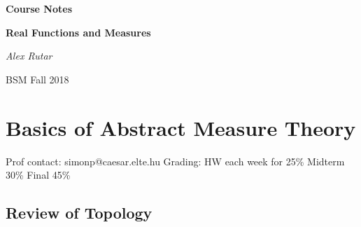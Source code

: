 \documentclass[12pt, a4paper]{book}
\theoremstyle{nonumberplain}
\newcommand{\assignmentname}{Course Notes}
\newcommand{\classname}{Real Functions and Measures}
\newcommand{\semester}{BSM Fall 2018}
\begin{document}
\begin{titlepage}
    \centering
    \vspace{5cm}
    {\huge\textbf{\assignmentname}\par} %
    \vspace{2cm}
    {\Large\textbf{\classname}\par} %
    \vspace{3cm}
    {\Large\textit{Alex Rutar}\par}

    \vfill

    {\large \semester \par} %
\end{titlepage}
{}
\tableofcontents
{}
\chapter{Basics of Abstract Measure Theory}
Prof contact: simonp@caesar.elte.hu
Grading: HW each week for 25\%
Midterm 30\%
Final 45\%

\section{Review of Topology}
\end{document}
